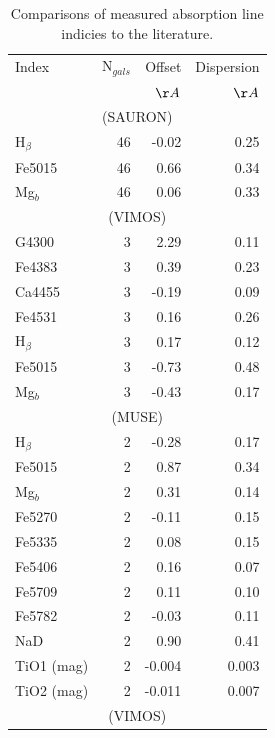 {{	%
	\begin{table}
	\begin{threeparttable}
		\centering
		\caption{Comparisons of measured absorption line indicies to the literature.}
		\label{tab:litAbsorption}
		\begin{tabular}{l r r r}
			\hline
			\hline
			Index 		& N$_{gals}$ & Offset 	& Dispersion \\
						& 			& $\AA$		& $\AA$ \\
			\hline
			\multicolumn{4}{c}{\citet{Vazdekis2010} (SAURON)} \\
			\hline
			H$_\beta$ 	& 46		& -0.02		& 0.25	\\
			Fe5015		& 46		& 0.66		& 0.34	\\
			Mg$_b$ 		& 46		& 0.06		& 0.33	\\
			\hline
			\multicolumn{4}{c}{\citet{Rampazzo2005} (VIMOS)} \\
			\hline
			G4300 		& 3 		& 2.29		& 0.11	\\
			Fe4383 		& 3 		& 0.39		& 0.23	\\
			Ca4455 		& 3 		& -0.19		& 0.09	\\
			Fe4531 		& 3 		& 0.16		& 0.26	\\
			H$_\beta$ 	& 3 		& 0.17		& 0.12	\\
			Fe5015 		& 3 		& -0.73		& 0.48	\\
			Mg$_b$ 		& 3 		& -0.43		& 0.17	\\
			\hline
			\multicolumn{4}{c}{\citet{Rampazzo2005} (MUSE)} \\
			\hline
			H$_\beta$ 	& 2 		& -0.28		& 0.17	\\ 
			Fe5015 		& 2 		& 0.87		& 0.34	\\ 
			Mg$_b$ 		& 2 		& 0.31		& 0.14	\\
			Fe5270 		& 2 		& -0.11		& 0.15	\\
			Fe5335 		& 2 		& 0.08		& 0.15	\\
			Fe5406 		& 2 		& 0.16		& 0.07	\\
			Fe5709 		& 2 		& 0.11		& 0.10	\\
			Fe5782 		& 2 		& -0.03		& 0.11	\\
			NaD 		& 2 		& 0.90		& 0.41	\\
			TiO1 (mag)	& 2 		& -0.004	& 0.003	\\
			TiO2 (mag)	& 2 		& -0.011	& 0.007	\\
			\hline
			\multicolumn{4}{c}{\citet{Ogando2008} (VIMOS)} \\

\end{tabular}
\end{threeparttable}
\end{table}}}
